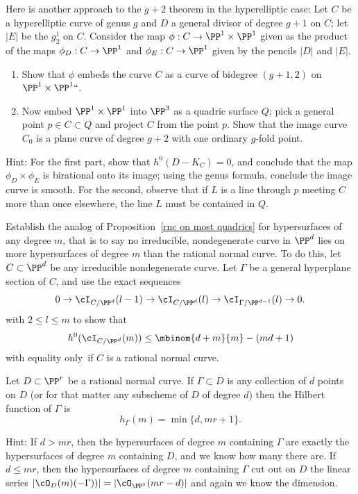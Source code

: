 \begin{exercise}
Here is another approach to the $g+2$ theorem in the hyperelliptic case:
%
Let $C$ be a 
hyperelliptic
%
curve of genus $g$ and $D$ a general divisor
of degree $g+1$ on $C$; let $|E|$ be the $g^1_2$ on $C$.
Consider the map $\phi : C \to \PP^1 \times \PP^1$ given as the product
of the maps $\phi_D : C \to \PP^1$ and $\phi_E : C \to \PP^1$ given by
the pencils $|D|$ and $|E|$.
\begin{enumerate}
\item Show that $\phi$ embeds the curve $C$ as a curve of bidegree
$(g+1,2)$ on $\PP^1 \times \PP^1` `$.
\item Now embed $\PP^1 \times \PP^1$ into $\PP^3$ as a quadric surface
$Q$; pick a general point $p \in C \subset Q$ and project $C$ from the
point $p$. Show that the image curve $C_0$ is a plane curve of degree
$g+2$ with one ordinary $g$-fold point.
\end{enumerate}

Hint: For the first part, show that $h^0(D - K_C) = 0$, and conclude
that the map $\phi_D \times \phi_E$ is birational onto its image; 
using
the genus formula, conclude the image curve is smooth. For the
second, observe that if $L$ is a line through $p$ meeting $C$ more than
once elsewhere, the line $L$ must be contained in $Q$.
\end{exercise}

\begin{exercise}\label{extremal m-ics}
Establish the analog of Proposition~\ref{rnc on most quadrics}
for hypersurfaces of any degree $m$, that is to say no irreducible,
nondegenerate curve in $\PP^d$ lies on more hypersurfaces of degree $m$
than the 
rational normal curve.
%
To do this, let $C\subset \PP^d$ be any irreducible nondegenerate
curve. Let $\Gamma$ be a general hyperplane section
of $C$, and use the exact sequences
$$
0 \to \cI_{C/\PP^d}(l-1) \to \cI_{C/\PP^d}(l) \to
\cI_{\Gamma/\PP^{d-1}}(l) \to 0.
$$
with $2 \leq l \leq m$ to show that
$$
h^0(\cI_{C/\PP^d}(m)) \leq  \mbinom{d+m}{m} - (md+1)
$$
with equality only~if $C$ is a rational normal curve.
\end{exercise}

\begin{exercise}\label{linear bound is sharp}
Let $D \subset \PP^r$ be a rational normal curve. If $\Gamma \subset D$
is any collection of $d$ points on $D$ (or for that matter any subscheme
of $D$ of degree $d$) then the 
Hilbert function
%
of $\Gamma$ is
$$
h_\Gamma(m) = \min\{d, mr+1\}
.
$$

Hint: If $d > mr$, then the hypersurfaces of degree $m$ containing
$\Gamma$ are exactly the hypersurfaces of degree $m$ containing $D$,
and we know how many there are. If $d \leq mr$, then the hypersurfaces
of degree $m$ containing $\Gamma$ cut out on $D$ the linear series
$|\cO_D(m)(-\Gamma))| = |\cO_{\PP^1}(mr-d)|$ and again we know the
dimension.
\end{exercise}

